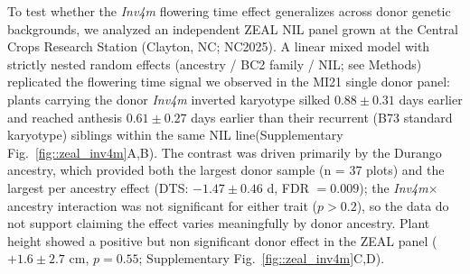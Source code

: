 \documentclass[9pt,twocolumn,twoside]{rilabRxiv}
\newcommand{\invfour}{\textit{Inv4m}\xspace}
\begin{document}
To test whether the \invfour flowering time effect generalizes across donor genetic backgrounds, we analyzed an independent ZEAL NIL panel grown at the Central Crops Research Station (Clayton, NC; NC2025). %
A linear mixed model with strictly nested random effects (ancestry / BC2 family / NIL; see Methods) replicated the flowering time signal we observed in the MI21 single donor panel: plants carrying the donor \invfour inverted karyotype silked $0.88 \pm 0.31$ days earlier and reached anthesis $0.61 \pm 0.27$ days earlier than their recurrent (B73 standard karyotype) siblings within the same NIL line(Supplementary Fig.~\ref{fig::zeal_inv4m}A,B). %
The contrast was driven primarily by the Durango ancestry, which provided both the largest donor sample (n = 37 plots) and the largest per ancestry effect (DTS: $-1.47 \pm 0.46$ d, FDR $= 0.009$); the \invfour $\times$ ancestry interaction was not significant for either trait ($p > 0.2$), so the data do not support claiming the effect varies meaningfully by donor ancestry.
Plant height showed a positive but non significant donor effect in the ZEAL panel ($+1.6 \pm 2.7$ cm, $p = 0.55$; Supplementary Fig.~\ref{fig::zeal_inv4m}C,D). 
\end{document}
